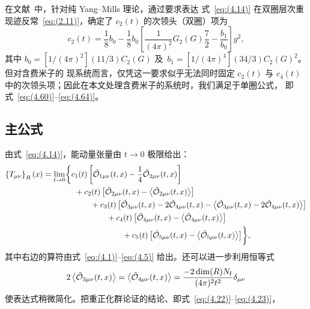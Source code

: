 在文献~\cite{Suzuki:2013gza}中，针对纯 Yang--Mills 理论，通过要求表达
式~\eqref{eq:(4.14)} 在双圈层次重现迹反常~\eqref{eq:(2.11)}，确定了 $c_2(t)$
的次领头（双圈）项为
\begin{equation}
   c_2(t)=\frac{1}{8}b_0
   -\frac{1}{8}b_0
   \left[\frac{1}{(4\pi)^2}G_2(G)\frac{7}{2}-\frac{b_1}{b_0}\right]g^2,
\label{eq:(4.69)}
\end{equation}
其中 $b_0=[1/(4\pi)^2](11/3)C_2(G)$ 及~$b_1=[1/(4\pi)^4](34/3)C_2(G)^2$。但对含费米子的
现系统而言，仅凭这一要求似乎无法同时固定 $c_2(t)$ 与 $c_4(t)$
中的次领头项；因此在本文处理含费米子的系统时，我们满足于单圈公式，
即式~\eqref{eq:(4.60)}--\eqref{eq:(4.64)}。

\subsection{主公式}
由式~\eqref{eq:(4.14)}，能动量张量由 $t\to0$ 极限给出：
\begin{align}
   \left\{T_{\mu\nu}\right\}_R(x)
   &=\lim_{t\to0}\biggl\{c_1(t)\left[
   \Tilde{\mathcal{O}}_{1\mu\nu}(t,x)
   -\frac{1}{4}\Tilde{\mathcal{O}}_{2\mu\nu}(t,x)
   \right]
\notag\\
   &\qquad\qquad{}
   +c_2(t)\left[
   \Tilde{\mathcal{O}}_{2\mu\nu}(t,x)
   -\left\langle\Tilde{\mathcal{O}}_{2\mu\nu}(t,x)\right\rangle
   \right]
\notag\\
   &\qquad\qquad\qquad{}
   +c_3(t)\left[
   \Tilde{\mathcal{O}}_{3\mu\nu}(t,x)
   -2\Tilde{\mathcal{O}}_{4\mu\nu}(t,x)
   -\left\langle
   \Tilde{\mathcal{O}}_{3\mu\nu}(t,x)
   -2\Tilde{\mathcal{O}}_{4\mu\nu}(t,x)
   \right\rangle
   \right]
\notag\\
   &\qquad\qquad\qquad\qquad{}
   +c_4(t)\left[
   \Tilde{\mathcal{O}}_{4\mu\nu}(t,x)
   -\left\langle\Tilde{\mathcal{O}}_{4\mu\nu}(t,x)\right\rangle
   \right]
\notag\\
   &\qquad\qquad\qquad\qquad\qquad{}
   +c_5(t)\left[
   \Tilde{\mathcal{O}}_{5\mu\nu}(t,x)
   -\left\langle\Tilde{\mathcal{O}}_{5\mu\nu}(t,x)\right\rangle
   \right]\biggr\},
\label{eq:(4.70)}
\end{align}
其中右边的算符由式~\eqref{eq:(4.1)}--\eqref{eq:(4.5)} 给出。还可以进一步利用恒等式
\begin{equation}
   2\left\langle\Tilde{\mathcal{O}}_{3\mu\nu}(t,x)\right\rangle
   =\left\langle\Tilde{\mathcal{O}}_{4\mu\nu}(t,x)\right\rangle
   =\frac{-2\dim(R)N_{\mathrm{f}}}{(4\pi)^2t^2}\delta_{\mu\nu}
\label{eq:(4.71)}
\end{equation}
使表达式稍微简化。把重正化群论证的结论、即式~\eqref{eq:(4.22)}--\eqref{eq:(4.23)}，
